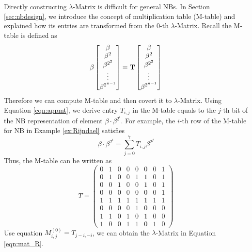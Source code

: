 Directly constructing $\lambda$-Matrix is difficult for general NBs. 
In Section \ref{sec:nbdesign}, we introduce the concept of multiplication table (M-table) and explained how its 
entries are transformed from the $0$-th $\lambda$-Matrix. 
Recall the M-table is defined as
\begin{equation}
\label{eqn:appmt}
\beta
\begin{bmatrix}
\beta \\ \beta^2 \\ \beta^{2^2} \\ \vdots \\ \beta^{2^{n-1}}
\end{bmatrix}
= {\bf T}
\begin{bmatrix}
\beta \\ \beta^2 \\ \beta^{2^2} \\ \vdots \\ \beta^{2^{n-1}}
\end{bmatrix}
\end{equation}
Therefore we can compute M-table and then covert it to $\lambda$-Matrix.
Using Equation \ref{eqn:appmt}, we derive entry $T_{i,j}$ in the M-table equals to
the $j$-th bit of the NB representation of element $\beta\cdot\beta^{2^{i}}$.
For example, the $i$-th row of the M-table for NB in Example \ref{ex:Rijndael} satisfies
$$\beta\cdot\beta^{2^i} = \sum_{j=0}^{7} T_{i,j}\beta^{2^j}$$
Thus, the M-table can be written as
\begin{equation*}
T = \left(\begin{array}{lccccccr}
0 &1 &0 &0 &0 &0 &0 &1 \\
0 &1 &0 &0 &1 &1 &0 &1 \\
0 &0 &1 &0 &0 &1 &0 &1 \\
0 &0 &0 &0 &0 &0 &0 &1 \\
1 &1 &1 &1 &1 &1 &1 &1 \\
0 &0 &0 &0 &1 &0 &0 &0 \\
1 &1 &0 &1 &0 &1 &0 &0 \\
1 &0 &0 &1 &1 &0 &1 &0
\end{array}\right)
\end{equation*}
Use equation $M_{i,j}^{(0)} = T_{j-i,-i}$, we can obtain the
$\lambda$-Matrix in Equation \ref{eqn:mat_R}.



